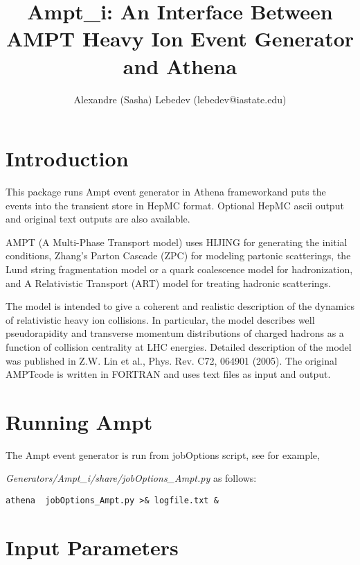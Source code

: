 \documentclass[11pt]{article}
\begin{document}
\title{\bf Ampt\_i: An Interface Between AMPT Heavy Ion Event Generator and Athena}
\author{ Alexandre (Sasha) Lebedev (lebedev@iastate.edu)}

\maketitle           

\section{Introduction}

This package runs Ampt event generator in Athena frameworkand puts the events into the
transient store in HepMC format. Optional HepMC ascii output and original text outputs
are also available.

AMPT (A Multi-Phase Transport model) uses HIJING for generating the initial conditions, 
Zhang's Parton Cascade (ZPC) for modeling partonic scatterings, the Lund string fragmentation 
model or a quark coalescence model for hadronization, and A Relativistic Transport (ART) model 
for treating hadronic scatterings. 

The model is intended to give a coherent and realistic description of the dynamics of relativistic 
heavy ion collisions. In particular, the model describes well pseudorapidity and transverse momentum 
distributions of charged hadrons as a function of collision centrality at LHC energies. 
Detailed description of the model was published in Z.W. Lin et al., Phys. Rev. C72, 064901 (2005). 
The original AMPTcode is written in FORTRAN and uses text files as input and output. 

\section {Running Ampt}

The Ampt event generator is run from jobOptions script, see for example, 

{\em Generators/Ampt\_i/share/jobOptions\_Ampt.py } as follows:

\begin{verbatim}
athena  jobOptions_Ampt.py >& logfile.txt &
\end{verbatim}



\section {Input Parameters}
\end{document}
